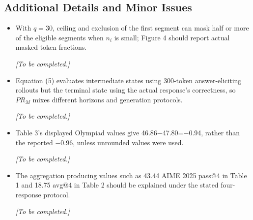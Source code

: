 \documentclass[11pt,a4paper]{article}
\begin{document}
\subsection*{Additional Details and Minor Issues}
\begin{itemize}
\item With $q = 30$, ceiling and exclusion of the first segment can mask half or more of the eligible segments when $n_i$ is small; Figure 4 should report actual masked-token fractions.
\par{}
\begin{responsebox}[frametitle={Response to M1},nobreak=true]
\textit{[To be completed.]}\par\vspace{1em}
\end{responsebox}

\item Equation (5) evaluates intermediate states using 300-token answer-eliciting rollouts but the terminal state using the actual response's correctness, so $PR_M$ mixes different horizons and generation protocols.
\par{}
\begin{responsebox}[frametitle={Response to M2},nobreak=true]
\textit{[To be completed.]}\par\vspace{1em}
\end{responsebox}

\item Table 3's displayed Olympiad values give 46.86\ensuremath{-}47.80=\ensuremath{-}0.94, rather than the reported \ensuremath{-}0.96, unless unrounded values were used.
\par{}
\begin{responsebox}[frametitle={Response to M3},nobreak=true]
\textit{[To be completed.]}\par\vspace{1em}
\end{responsebox}

\item The aggregation producing values such as 43.44 AIME 2025 pass@4 in Table 1 and 18.75 avg@4 in Table 2 should be explained under the stated four-response protocol.
\par{}
\begin{responsebox}[frametitle={Response to M4},nobreak=true]
\textit{[To be completed.]}\par\vspace{1em}
\end{responsebox}


\end{itemize}
\end{document}
